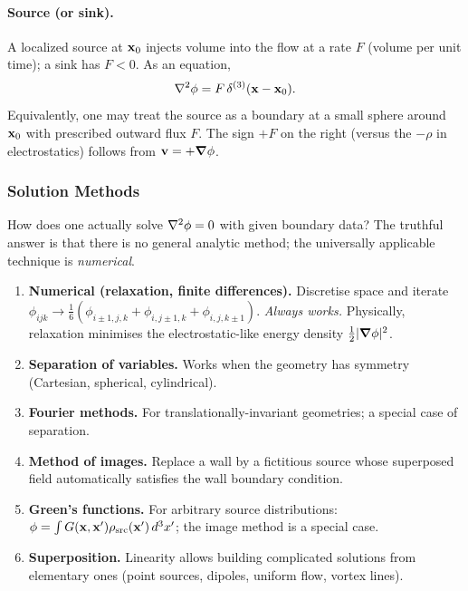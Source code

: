 \documentclass[../main.tex]{subfiles}
\begin{document}
\paragraph{Source (or sink).}
A localized source at $\mathbf{x}_0$ injects volume into the flow at a rate $F$ (volume per unit time); a sink has $F<0$. As an equation,
\begin{equation}
  \nabla^2\phi = F\,\delta^{(3)}(\mathbf{x} - \mathbf{x}_0).
  \label{eq:lec15_bc_source}
\end{equation}
Equivalently, one may treat the source as a boundary at a small sphere around $\mathbf{x}_0$ with prescribed outward flux $F$. The sign $+F$ on the right (versus the $-\rho$ in electrostatics) follows from $\mathbf{v}=+\grad\phi$.

\subsubsection{Solution Methods}

How does one actually solve $\nabla^2\phi=0$ with given boundary data? The truthful answer is that there is no general analytic method; the universally applicable technique is \emph{numerical}.

\begin{enumerate}
  \item \textbf{Numerical (relaxation, finite differences).} Discretise space and iterate
  $\phi_{ijk} \to \tfrac{1}{6}(\phi_{i\pm 1,j,k}+\phi_{i,j\pm 1,k}+\phi_{i,j,k\pm 1})$.
  \emph{Always works.} Physically, relaxation minimises the electrostatic-like energy density $\tfrac{1}{2}|\grad\phi|^2$.
  \item \textbf{Separation of variables.} Works when the geometry has symmetry (Cartesian, spherical, cylindrical).
  \item \textbf{Fourier methods.} For translationally-invariant geometries; a special case of separation.
  \item \textbf{Method of images.} Replace a wall by a fictitious source whose superposed field automatically satisfies the wall boundary condition.
  \item \textbf{Green's functions.} For arbitrary source distributions: $\phi = \int G(\mathbf{x},\mathbf{x}')\rho_{\rm src}(\mathbf{x}')\,d^3x'$; the image method is a special case.
  \item \textbf{Superposition.} Linearity allows building complicated solutions from elementary ones (point sources, dipoles, uniform flow, vortex lines).
\end{enumerate}
\end{document}

